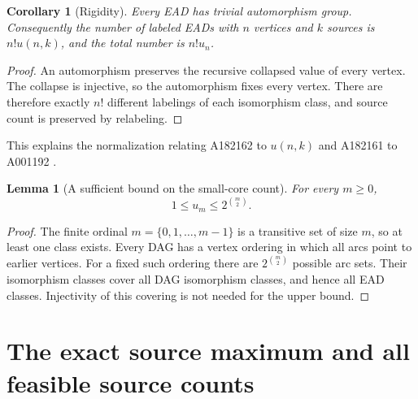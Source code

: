 \documentclass[11pt,a4paper]{article}
\newtheorem{lemma}[theorem]{Lemma}
\newtheorem{corollary}[theorem]{Corollary}
\theoremstyle{definition}
\begin{document}
\begin{corollary}[Rigidity]\label{sbd:cor:rigid}
Every EAD has trivial automorphism group. Consequently the number of
labeled EADs with $n$ vertices and $k$ sources is $n!u(n,k)$, and the total
number is $n!u_n$.
\end{corollary}
\begin{proof}
An automorphism preserves the recursive collapsed value of every vertex.
The collapse is injective, so the automorphism fixes every vertex.
There are therefore exactly $n!$ different labelings of each isomorphism
class, and source count is preserved by relabeling.
\end{proof}
This explains the normalization relating A182162 to $u(n,k)$ and
A182161 to A001192 \cite{oeis162,oeis161,oeis1192}.

\begin{lemma}[A sufficient bound on the small-core count]\label{sbd:lem:ubound}
For every $m\ge0$,
\begin{equation}\label{sbd:eq:smallcore-bound}
 1\le u_m\le 2^{\binom m2}.
\end{equation}
\end{lemma}
\begin{proof}
The finite ordinal $m=\{0,1,\ldots,m-1\}$ is a transitive set of size $m$,
so at least one class exists. Every DAG has a vertex ordering in which
all arcs point to earlier vertices. For a fixed such ordering there are
$2^{\binom m2}$ possible arc sets. Their isomorphism classes cover all
DAG isomorphism classes, and hence all EAD classes. Injectivity of this
covering is not needed for the upper bound.
\end{proof}

\section{The exact source maximum and all feasible source counts}
\end{document}
